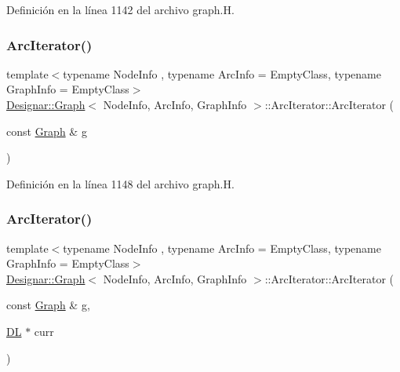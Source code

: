Definición en la línea 1142 del archivo graph.\+H.

\mbox{\label{class_designar_1_1_graph_1_1_arc_iterator_afeb58fdc5c6d4fd2d57c2ce53969203e}} 
\subsubsection{\texorpdfstring{Arc\+Iterator()}{ArcIterator()}\hspace{0.1cm}{\footnotesize\ttfamily [2/5]}}
{\footnotesize\ttfamily template$<$typename Node\+Info , typename Arc\+Info  = Empty\+Class, typename Graph\+Info  = Empty\+Class$>$ \\
\hyperlink{class_designar_1_1_graph}{Designar\+::\+Graph}$<$ Node\+Info, Arc\+Info, Graph\+Info $>$\+::Arc\+Iterator\+::\+Arc\+Iterator (\begin{DoxyParamCaption}\item[{const \hyperlink{class_designar_1_1_graph}{Graph} \&}]{g }\end{DoxyParamCaption})\hspace{0.3cm}{\ttfamily [inline]}}



Definición en la línea 1148 del archivo graph.\+H.

\mbox{\label{class_designar_1_1_graph_1_1_arc_iterator_a2a9eb9d16ff5d80a22671dfdbe9ce3a2}} 
\subsubsection{\texorpdfstring{Arc\+Iterator()}{ArcIterator()}\hspace{0.1cm}{\footnotesize\ttfamily [3/5]}}
{\footnotesize\ttfamily template$<$typename Node\+Info , typename Arc\+Info  = Empty\+Class, typename Graph\+Info  = Empty\+Class$>$ \\
\hyperlink{class_designar_1_1_graph}{Designar\+::\+Graph}$<$ Node\+Info, Arc\+Info, Graph\+Info $>$\+::Arc\+Iterator\+::\+Arc\+Iterator (\begin{DoxyParamCaption}\item[{const \hyperlink{class_designar_1_1_graph}{Graph} \&}]{g,  }\item[{\hyperlink{class_designar_1_1_d_l}{DL} $\ast$}]{curr }\end{DoxyParamCaption})\hspace{0.3cm}{\ttfamily [inline]}}



